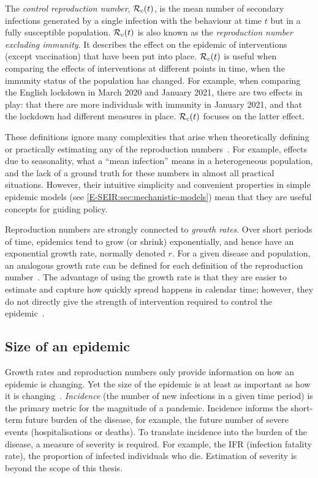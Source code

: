 \documentclass[thesis.tex]{subfiles}
\begin{document}
The \emph{control reproduction number}, $\mathcal{R}_{c}(t)$, is the mean number of secondary infections generated by a single infection with the behaviour at time $t$ but in a fully susceptible population.
$\mathcal{R}_{c}(t)$ is also known as the \emph{reproduction number excluding immunity}.
It describes the effect on the epidemic of interventions (except vaccination) that have been put into place.
$\mathcal{R}_{c}(t)$ is useful when comparing the effects of interventions at different points in time, when the immunity status of the population has changed.
For example, when comparing the English lockdown in March 2020 and January 2021, there are two effects in play: that there are more individuals with immunity in January 2021, and that the lockdown had different measures in place.
$\mathcal{R}_{c}(t)$ focuses on the latter effect.

These definitions ignore many complexities that arise when theoretically defining or practically estimating any of the reproduction numbers~\autocite{pellisEstimation}.
For example, effects due to seasonality, what a ``mean infection'' means in a heterogeneous population, and the lack of a ground truth for these numbers in almost all practical situations.
However, their intuitive simplicity and convenient properties in simple epidemic models (see \cref{E-SEIR:sec:mechanistic-models}) mean that they are useful concepts for guiding policy.

Reproduction numbers are strongly connected to \emph{growth rates}.
Over short periods of time, epidemics tend to grow (or shrink) exponentially, and hence have an exponential growth rate, normally denoted $r$.
For a given disease and population, an analogous growth rate can be defined for each definition of the reproduction number~\autocite{pellisEstimation,paragGrowthRates,wallingaGI}.
The advantage of using the growth rate is that they are easier to estimate and capture how quickly spread happens in calendar time; however, they do not directly give the strength of intervention required to control the epidemic~\autocite{royalSocietyRnumber}.

\subsection{Size of an epidemic}

Growth rates and reproduction numbers only provide information on how an epidemic is changing.
Yet the size of the epidemic is at least as important as how it is changing~\autocite{pellisEstimation}.
\emph{Incidence} (the number of new infections in a given time period) is the primary metric for the magnitude of a pandemic.
Incidence informs the short-term future burden of the disease, for example, the future number of severe events (hospitalisations or deaths).
To translate incidence into the burden of the disease, a measure of severity is required.
For example, the IFR (infection fatality rate), the proportion of infected individuals who die.
Estimation of severity is beyond the scope of this thesis.
\end{document}
